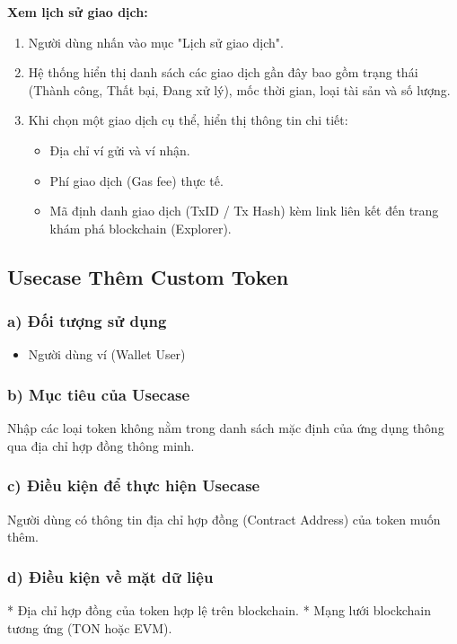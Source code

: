\documentclass[a4paper]{report}
\begin{document}
\textbf{Xem lịch sử giao dịch:}
\begin{enumerate}
    \item Người dùng nhấn vào mục "Lịch sử giao dịch".
    \item Hệ thống hiển thị danh sách các giao dịch gần đây bao gồm trạng thái (Thành công, Thất bại, Đang xử lý), mốc thời gian, loại tài sản và số lượng.
    \item Khi chọn một giao dịch cụ thể, hiển thị thông tin chi tiết:
    \begin{itemize}
        \item Địa chỉ ví gửi và ví nhận.
        \item Phí giao dịch (Gas fee) thực tế.
        \item Mã định danh giao dịch (TxID / Tx Hash) kèm link liên kết đến trang khám phá blockchain (Explorer).
    \end{itemize}
\end{enumerate}

\subsection{Usecase Thêm Custom Token}

\subsubsection{a) Đối tượng sử dụng}
\begin{itemize}
    \item Người dùng ví (Wallet User)
\end{itemize}

\subsubsection{b) Mục tiêu của Usecase}
Nhập các loại token không nằm trong danh sách mặc định của ứng dụng thông qua địa chỉ hợp đồng thông minh.

\subsubsection{c) Điều kiện để thực hiện Usecase}
Người dùng có thông tin địa chỉ hợp đồng (Contract Address) của token muốn thêm.

\subsubsection{d) Điều kiện về mặt dữ liệu}
* Địa chỉ hợp đồng của token hợp lệ trên blockchain.
* Mạng lưới blockchain tương ứng (TON hoặc EVM).
\end{document}
